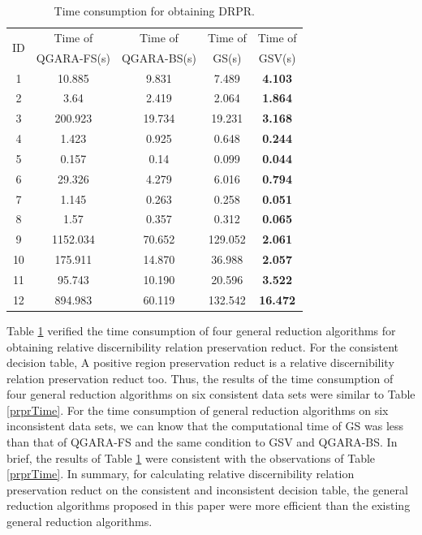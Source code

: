 \documentclass[review]{elsarticle}
\begin{document}
		\begin{table}[htbp]
			\centering
			\caption{Time consumption for obtaining DRPR.}
			\label{drprTime}
			\begin{tabular}{ccccc}
				\hline
				\multirow{2}{*}{ID} & Time of     & Time of & Time of     & Time of \\
				& QGARA-FS(s) & QGARA-BS(s)   & GS(s) & GSV(s)  \\ \hline
				1   & 10.885  & 9.831  & 7.489    & \textbf{4.103} \\
				2   & 3.64    & 2.419  & 2.064    & \textbf{1.864} \\
				3   & 200.923 & 19.734 & 19.231   & \textbf{3.168} \\
				4   & 1.423   & 0.925  & 0.648    & \textbf{0.244} \\
				5   & 0.157   & 0.14   & 0.099    & \textbf{0.044} \\
				6   & 29.326  & 4.279  & 6.016    & \textbf{0.794} \\
				7   & 1.145   & 0.263  & 0.258    & \textbf{0.051} \\
				8   & 1.57    & 0.357  & 0.312    & \textbf{0.065} \\
				9   & 1152.034& 70.652 & 129.052  & \textbf{2.061} \\
				10  & 175.911 & 14.870 & 36.988   & \textbf{2.057} \\
				11  & 95.743  & 10.190 & 20.596   & \textbf{3.522} \\
				12  & 894.983 & 60.119 & 132.542  & \textbf{16.472} \\ \hline
			\end{tabular}
		\end{table}
		\par Table \ref{drprTime} verified the time consumption of four general reduction algorithms for obtaining relative discernibility relation preservation reduct. For the consistent decision table, A positive region preservation reduct is a relative discernibility relation preservation reduct too. Thus, the results of the time consumption of four general reduction algorithms on six consistent data sets were similar to Table \ref{prprTime}. For the time consumption of general reduction algorithms on six inconsistent data sets, we can know that the computational time of GS was less than that of QGARA-FS and the same condition to GSV and QGARA-BS. In brief, the results of Table \ref{drprTime} were consistent with the observations of Table \ref{prprTime}. In summary, for calculating relative discernibility relation preservation reduct on the consistent and inconsistent decision table, the general reduction algorithms proposed in this paper were more efficient than the existing general reduction algorithms. 
\end{document}
